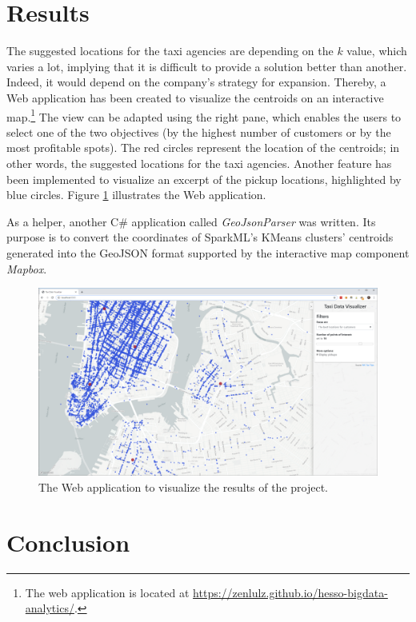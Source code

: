 \documentclass[a4paper]{article}
\begin{document}
\section{Results}
The suggested locations for the taxi agencies are depending on the $k$ value, which varies a lot, implying that it is difficult to provide a solution better than another. Indeed, it would depend on the company's strategy for expansion. Thereby, a Web application has been created to visualize the centroids on an interactive map.\footnote{The web application is located at \url{https://zenlulz.github.io/hesso-bigdata-analytics/}.} The view can be adapted using the right pane, which enables the users to select one of the two objectives (by the highest number of customers or by the most profitable spots). The red circles represent the location of the centroids; in other words, the suggested locations for the taxi agencies. Another feature has been implemented to visualize an excerpt of the pickup locations, highlighted by blue circles. Figure \ref{fig:web-app} illustrates the Web application.

As a helper, another C\# application called \emph{GeoJsonParser} was written. Its purpose is to convert the coordinates of SparkML's KMeans clusters' centroids generated into the GeoJSON format supported by the interactive map component \emph{Mapbox}.

\begin{figure}
  \centering
  \includegraphics[width=\textwidth]{images/web-app.png}
  \caption{The Web application to visualize the results of the project.}
  \label{fig:web-app}
\end{figure}

\section{Conclusion}
\end{document}
